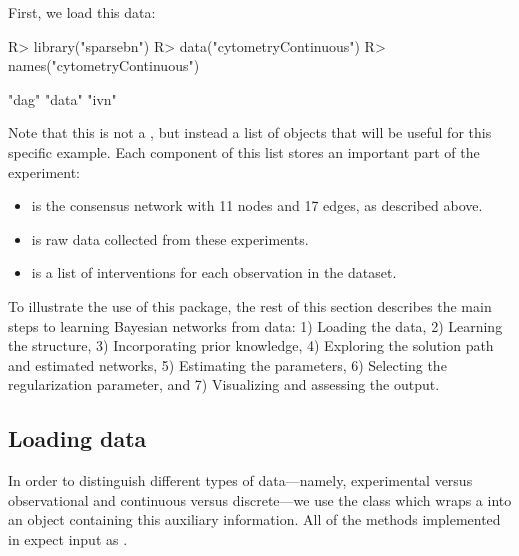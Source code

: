 \documentclass[article]{jss}
\renewcommand{\|}{\,|\,}
\begin{document}
First, we load this data:
%
\begin{CodeChunk}
\begin{CodeInput}
R> library("sparsebn")
R> data("cytometryContinuous")
R> names("cytometryContinuous")
\end{CodeInput}
\begin{CodeOutput}                          
  [1] "dag"  "data" "ivn" 
\end{CodeOutput}
\end{CodeChunk}
%
Note that this is not a , but instead a list of  objects that will be useful for this specific example. Each component of this list stores an important part of the experiment:
\begin{itemize}
\item {} is the consensus network with 11 nodes and 17 edges, as described above.
\item {} is raw data collected from these experiments.
\item {} is a list of interventions for each observation in the dataset.
\end{itemize}

\noindent
To illustrate the use of this package, the rest of this section describes the main steps to learning Bayesian networks from data: 1) Loading the data, 2) Learning the structure, 3) Incorporating prior knowledge, 4) Exploring the solution path and estimated networks, 5) Estimating the parameters, 6) Selecting the regularization parameter, and 7) Visualizing and assessing the output. 

\subsection{Loading data}
\label{subsec:load}

In order to distinguish different types of data---namely, experimental versus observational and continuous versus discrete---we use the  class which wraps a  into an object containing this auxiliary information. All of the methods implemented in  expect input as . 
\end{document}
